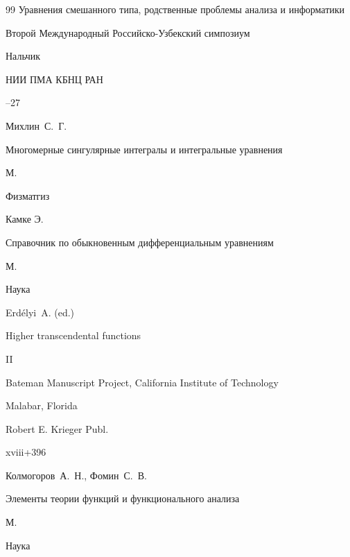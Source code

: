 \begin{thebibliography}{99}
\inbook Уравнения смешанного типа, родственные проблемы анализа и информатики

\bookinfo Второй Международный Российско-Узбекский симпозиум

\publaddr Нальчик

\publ НИИ ПМА КБНЦ РАН


--27




\by Михлин~С.~Г.

\book Многомерные сингулярные интегралы и интегральные уравнения

\publaddr М.

\publ Физматгиз






\by Камке Э.

\book  Справочник по обыкновенным дифференциальным уравнениям

\publaddr М.

\publ Наука






\by Erdélyi~A. (ed.)

\book  Higher transcendental functions

\bookvol II


\serial Bateman Manuscript Project, California Institute of Technology

\publaddr Malabar, Florida

\publ Robert E. Krieger Publ. 

\totalpages xviii+396 





\by  Колмогоров~А.~Н., Фомин~С.~В.

\book  Элементы теории функций и функционального анализа

\publaddr М.

\publ Наука






\end{thebibliography}
